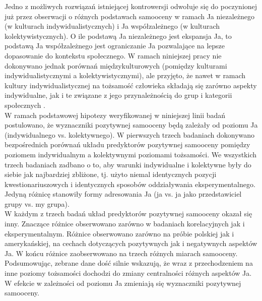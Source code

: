 \documentclass[man]{apa6}
\begin{document}
Jedno z możliwych rozwiązań istniejącej kontrowersji odwołuje się do poczynionej już przez \textcite{markus1991culture} obserwacji o różnych podstawach samooceny w ramach Ja niezależnego (w kulturach indywidualistycznych) i Ja współzależnego (w kulturach kolektywistycznych). O ile podstawą Ja niezależnego jest ekspansja Ja, to podstawą Ja współzależnego jest ograniczanie Ja pozwalające na lepsze dopasowanie do kontekstu społecznego. W ramach niniejszej pracy nie dokonywano jednak porównań międzykulturowych (pomiędzy kulturami indywidualistycznymi a kolektywistycznymi), ale przyjęto, że nawet w ramach kultury indywidualistycznej na tożsamość człowieka składają się zarówno aspekty indywidualne, jak i te związane z jego przynależnością do grup i kategorii społecznych \parencite[np.,][]{brewer1996we, turner1987rediscovering}. \\

W ramach podstawowej hipotezy weryfikowanej w niniejszej linii badań postulowano, że wyznaczniki pozytywnej samooceny będą zależały od poziomu Ja (indywidualnego vs. kolektywnego). W pierwszych trzech badaniach dokonywano bezpośrednich porównań układu predyktorów pozytywnej samooceny pomiędzy poziomem indywidualnym a kolektywnymi poziomami tożsamości. We wszystkich trzech badaniach zadbano o to, aby warunki indywidualne i kolektywne były do siebie jak najbardziej zbliżone, tj. użyto niemal identycznych pozycji kwestionariuszowych i identycznych sposobów oddziaływania eksperymentalnego. Jedyną różnicę stanowiły formy adresowania Ja (ja vs. ja jako przedstawiciel grupy vs. my grupa).\\

W każdym z trzech badań układ predyktorów pozytywnej samooceny okazał się inny. Znaczące różnice obserwowano zarówno w badaniach korelacyjnych jak i eksperymentalnym. Różnice obserwowano zarówno na próbie polskiej jak i amerykańskiej, na cechach dotyczących pozytywnych jak i negatywnych aspektów Ja. W końcu różnice zaobserwowano na trzech różnych miarach samooceny. Podsumowując, zebrane dane dość silnie wskazują, że wraz z przechodzeniem na inne poziomy tożsamości dochodzi do zmiany centralności różnych aspektów Ja. W efekcie w zależności od poziomu Ja zmieniają się wyznaczniki pozytywnej samooceny.\\
\end{document}

